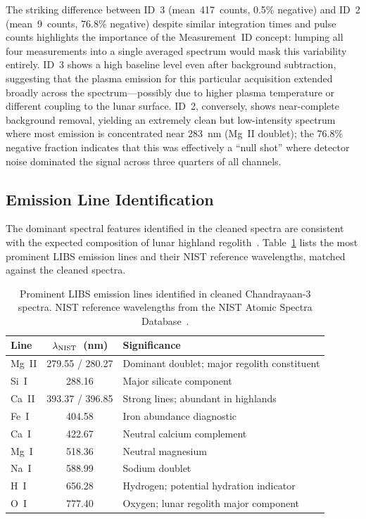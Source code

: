 \documentclass[a4paper,twocolumn,10pt]{article}
\begin{document}
The striking difference between ID~3 (mean~417~counts, 0.5\% negative)
and ID~2 (mean~9~counts, 76.8\% negative) despite similar integration
times and pulse counts
highlights the importance of the Measurement~ID concept: lumping all
four measurements into a single averaged spectrum would mask this
variability entirely.  ID~3 shows a high baseline level even after
background subtraction, suggesting that the plasma emission for this
particular acquisition extended broadly across the spectrum---possibly
due to higher plasma temperature or different coupling to the lunar
surface.  ID~2, conversely, shows near-complete background removal,
yielding an extremely clean but low-intensity spectrum where most
emission is concentrated near 283~nm (Mg~II doublet); the 76.8\%
negative fraction indicates that this was effectively a ``null shot''
where detector noise dominated the signal across three quarters of
all channels.

\subsection{Emission Line Identification}

The dominant spectral features identified in the cleaned spectra are
consistent with the expected composition of lunar highland
regolith~\cite{Sridhar2025,ISROCh3}.  Table~\ref{tab:emission_lines}
lists the most prominent LIBS emission lines and their NIST reference
wavelengths, matched against the cleaned spectra.

\begin{table}[htbp]
\centering
\caption{Prominent LIBS emission lines identified in cleaned
  Chandrayaan-3 spectra.  NIST reference wavelengths from the
  NIST Atomic Spectra Database~\cite{NIST}.}
\label{tab:emission_lines}
{\small
\begin{tabularx}{\columnwidth}{@{}lcX@{}}
\toprule
\textbf{Line} & \textbf{$\lambda_{\rm NIST}$~(nm)} &
  \textbf{Significance} \\
\midrule
Mg~II & 279.55 / 280.27 & Dominant doublet; major regolith
  constituent \\
Si~I  & 288.16 & Major silicate component \\
Ca~II & 393.37 / 396.85 & Strong lines; abundant in highlands \\
Fe~I  & 404.58 & Iron abundance diagnostic \\
Ca~I  & 422.67 & Neutral calcium complement \\
Mg~I  & 518.36 & Neutral magnesium \\
Na~I  & 588.99 & Sodium doublet \\
H~I   & 656.28 & Hydrogen; potential hydration indicator \\
O~I   & 777.40 & Oxygen; lunar regolith major component \\
\bottomrule
\end{tabularx}
}
\end{table}
\end{document}
